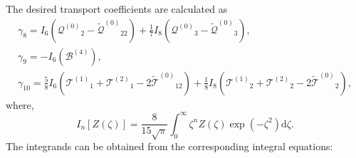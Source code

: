 \documentclass[]{elsarticle} %
\newcommand{\dd}{\mathrm{d}}
\newcommand{\B}{\ensuremath{\mathcal{B}^{(4)}}}
\newcommand{\Q}{\ensuremath{\mathcal{Q}^{(0)}}}
\newcommand{\T}[1]{\ensuremath{\mathcal{T}^{(#1)}}}
\newcommand{\TT}{\ensuremath{\tilde{\mathcal{T}}^{(0)}}}
\newcommand{\QQ}{\ensuremath{\tilde{\mathcal{Q}}^{(0)}}}
\begin{document}
The desired transport coefficients are calculated as
\begin{gather}
    \gamma_8 = I_6\left(\Q_2 - \QQ_{22}\right) + \frac17 I_8\left(\Q_3 - \QQ_3\right), \label{eq:gamma_8}\\
    \gamma_9 = -I_6\left(\B\right), \label{eq:gamma_9}\\
    \gamma_{10} = \frac58 I_6\left(\T{1}_1 + \T{2}_1 - 2\TT_{12}\right)
        + \frac18 I_8\left(\T{1}_2 + \T{2}_2 - 2\TT_2\right), \label{eq:gamma_10}
\end{gather}
where,
\begin{equation}\label{eq:I_n}
    I_n[Z(\zeta)] = \frac{8}{15\sqrt{\pi}} \int_0^\infty \zeta^n Z(\zeta) \exp(-\zeta^2) \dd\zeta.
\end{equation}
The integrands can be obtained from the corresponding integral equations:
\end{document}
